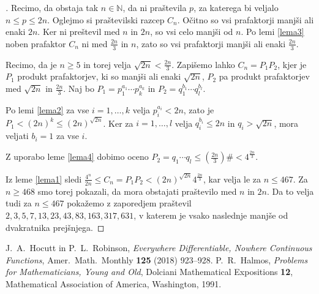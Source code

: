 \documentclass[a4paper,12pt]{article}
\def\N{\mathbb{N}}
\theoremstyle{definition}
\theoremstyle{plain}
\newenvironment{dokaz}{\begin{proof}[\bfseries\upshape\proofname]}{\end{proof}}
\begin{document}
\begin{dokaz}
    Recimo, da obstaja tak $n \in \N$, da ni praštevila $p$, za katerega bi veljalo $n \leq p \leq 2n$. Oglejmo si praštevilski razcep $C_n$. Očitno so vsi prafaktorji manjši ali enaki $2n$. Ker ni preštevil med $n$ in $2n$, so vsi celo manjši od $n$. Po lemi \ref{lema3} noben prafaktor $C_n$ ni med $\frac{2n}{3}$ in $n$, zato so vsi prafaktorji manjši ali enaki $\frac{2n}{3}$.

    Recimo, da je $n \geq 5$ in torej velja $\sqrt{2n} < \frac{2n}{3}$. Zapišemo lahko $C_n = P_1 P_2$, kjer je $P_1$ produkt prafaktorjev, ki so manjši ali enaki $\sqrt{2n}$, $P_2$ pa produkt prafaktorjev med $\sqrt{2n}$ in $\frac{2n}{3}$. Naj bo $P_1 = p_1^{a_1} \cdots p_k^{a_k}$ in $P_2 = q_1^{b_1} \cdots q_l^{b_l}$. 
    
    Po lemi \ref{lema2} za vse $i = 1, \ldots, k$ velja $p_i^{a_i} < 2n$, zato je $P_1 < (2n)^k \leq (2n)^{\sqrt{2n}}$. Ker za $i = 1, \ldots, l$ velja $q_i^{b_i} \leq 2n$ in $q_i > \sqrt{2n}$, mora veljati $b_i = 1$ za vse $i$. 
    
    Z uporabo leme \ref{lema4} dobimo oceno $P_2 = q_1 \cdots q_l \leq (\frac{2n}{3})\# < 4^\frac{2n}{3}$. 
    
    Iz leme \ref{lema1} sledi $\frac{4^n}{2n} \leq C_n = P_1 P_2 < (2n)^{\sqrt{2n}} 4^{\frac{2n}{3}}$, kar velja le za $n \leq 467$. Za $n \geq 468$ smo torej pokazali, da mora obstajati praštevilo med $n$ in $2n$. Da to velja tudi za $n \leq 467$ pokažemo z zaporedjem praštevil $2, 3, 5, 7, 13, 23, 43, 83, 163, 317, 631$, v katerem je vsako naslednje manjše od dvakratnika prejšnjega.
\end{dokaz}



\begin{thebibliography}{1}
    J.~A.~Hocutt in P.~L.~Robinson, \emph{Everywhere Differentiable, Nowhere Continuous Functions}, Amer.~Math.~Monthly \textbf{125} (2018) 923--928.
    P.~R.~Halmos, \emph{Problems for Mathematicians, Young and Old}, Dolciani Mathematical Expositions \textbf{12}, Mathematical Association of America, Washington, 1991.
\end{thebibliography}
\end{document}

